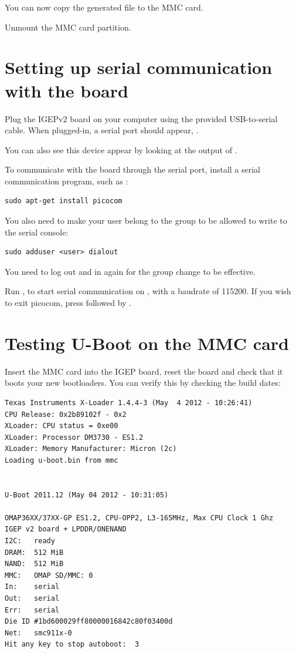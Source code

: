 You can now copy the generated  file to the MMC card.

Unmount the MMC card partition.

\section{Setting up serial communication with the board}

Plug the IGEPv2 board on your computer using the provided
USB-to-serial cable. When plugged-in, a serial port should appear,
.

You can also see this device appear by looking at the output of
.

To communicate with the board through the serial port, install a
serial communication program, such as :

\begin{verbatim}
sudo apt-get install picocom
\end{verbatim}

You also need to make your user belong to the  group to be
allowed to write to the serial console:

\begin{verbatim}
sudo adduser <user> dialout
\end{verbatim}

You need to log out and in again for the group change to be effective.

Run , to start serial
communication on , with a baudrate of 115200. If
you wish to exit picocom, press \code{[Ctrl][a]} followed by
\code{[Ctrl][x]}.

\section{Testing U-Boot on the MMC card}

Insert the MMC card into the IGEP board, reset the board and check
that it boots your new bootloaders. You can verify this by checking
the build dates:

\begin{verbatim}
Texas Instruments X-Loader 1.4.4-3 (May  4 2012 - 10:26:41)
CPU Release: 0x2b89102f - 0x2
XLoader: CPU status = 0xe00
XLoader: Processor DM3730 - ES1.2
XLoader: Memory Manufacturer: Micron (2c)
Loading u-boot.bin from mmc


U-Boot 2011.12 (May 04 2012 - 10:31:05)

OMAP36XX/37XX-GP ES1.2, CPU-OPP2, L3-165MHz, Max CPU Clock 1 Ghz
IGEP v2 board + LPDDR/ONENAND
I2C:   ready
DRAM:  512 MiB
NAND:  512 MiB
MMC:   OMAP SD/MMC: 0
In:    serial
Out:   serial
Err:   serial
Die ID #1bd600029ff80000016842c80f03400d
Net:   smc911x-0
Hit any key to stop autoboot:  3
\end{verbatim}

